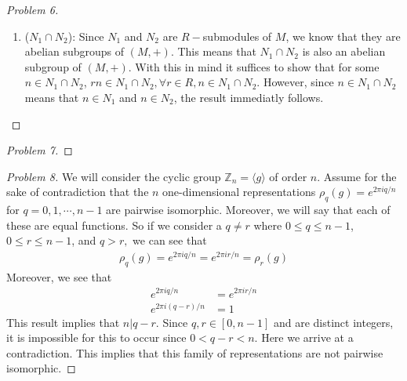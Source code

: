\documentclass[titlepage]{article}
\theoremstyle{plain}
\theoremstyle{definition}
\theoremstyle{remark}
\theoremstyle{exercise-style}
\numberwithin{equation}{section}
\numberwithin{theorem}{section}
\numberwithin{remark}{section}
\begin{document}
\begin{proof}[Problem 6]
\begin{enumerate}
\begin{align}
            &= n_1 + p_1 + n_2 + p_2 \\
            &= n_1 +p_1 + p_2  + n_2 \\
            &= p_1 + n_1 + p_2 + n_2 \\
            &= p_1 + p_2 + n_1 + n_2 \\
            &= (p_1 + p_2) + (n_1 + n_2).
        \end{align}
        From these results we can say that $N_1 + N_2$ is an abelian subgroup of $(M,+)$. Now finally we must show that $r(n_1 + n_2) \in N_1 + N_2, \forall r \in R, n_1 +n_2 \in N_1 + N_2$. To preface, we know that $rn_1 \in N_1$ and $rn_2 \in N_2$. So when we evaluate $r(n_1 + n_2) = rn_1 + rn_2$ we arrive at this since these numbers live in our $R-$module $M$. This shows that $r(n_1 + n_2) = rn_1 + rn_2 \in N_1 + N_2$.
        \item ($N_1 \cap N_2$): Since $N_1$ and $N_2$ are $R-$submodules of $M$, we know that they are abelian subgroups of $(M, +)$. This means that $N_1 \cap N_2$ is also an abelian subgroup of $(M, +)$. With this in mind it suffices to show that for some $n \in N_1 \cap N_2$, $rn \in N_1 \cap N_2, \forall r\in R, n \in N_1 \cap N_2$. However, since $n \in N_1 \cap N_2$ means that $n \in N_1$ and $n \in N_2$, the result immediatly follows.
    \end{enumerate}
\end{proof}

\begin{proof}[Problem 7]
    
\end{proof}

\begin{proof}[Problem 8]
    We will consider the cyclic group $\mathbb{Z}_n = \langle g \rangle$ of order $n$. Assume for the sake of contradiction that the $n$ one-dimensional representations $\rho_q(g) = e^{2 \pi i q/n}$ for $q = 0, 1, \cdots , n-1$ are pairwise isomorphic. Moreover, we will say that each of these are equal functions. So if we consider a $q \neq r$ where $0 \leq q \leq n-1$, $0 \leq r \leq n-1$, and $q > r,$ we can see that
    \begin{align}
        \rho_q(g) = e^{2 \pi i q/n} = e^{2 \pi i r/n} = \rho_r(g)
    \end{align}
    Moreover, we see that
    \begin{align}
        e^{2 \pi i q/n} &= e^{2 \pi i r/n} \\
        e^{2 \pi i (q-r)/n} &= 1
    \end{align}
    This result implies that $n| q-r$. Since $q, r \in [0,n-1]$ and are distinct integers, it is impossible for this to occur since $0 < q-r < n$. Here we arrive at a contradiction. This implies that this family of representations are not pairwise isomorphic.
\end{proof}
\end{document}
